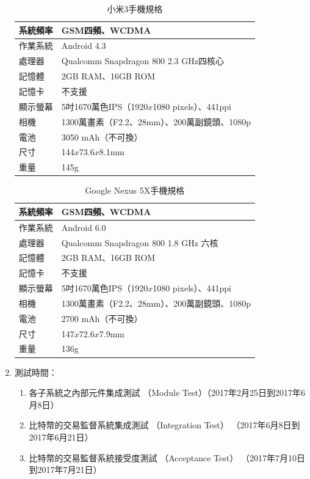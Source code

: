 \begin{enumerate}
	 				\begin{table}[!htbp]
					\centering
					\caption{小米3手機規格}
					\label{mi}
					\begin{tabular}{|l|l|}
					\hline
					系統頻率 & GSM四頻、WCDMA \\ \hline
					作業系統 & Android 4.3 \\ \hline
					處理器 & Qualcomm Snapdragon 800 2.3 GHz四核心 \\ \hline
					記憶體 & 2GB RAM、16GB ROM \\ \hline
					記憶卡 & 不支援 \\ \hline
					顯示螢幕 & 5吋1670萬色IPS（1920$x$1080 pixels）、441ppi \\ \hline
					相機 & 1300萬畫素（F2.2、28mm）、200萬副鏡頭、1080p \\ \hline
					電池 & 3050 mAh（不可換） \\ \hline
					尺寸 & 144$x$73.6$x$8.1mm \\ \hline
					重量 & 145g \\ \hline
					\end{tabular}
					\end{table}

					\begin{table}[!htbp]
					\centering
					\caption{Google Nexus 5X手機規格}
					\label{5x}
					\begin{tabular}{|l|l|}
					\hline
					系統頻率 & GSM四頻、WCDMA \\ \hline
					作業系統 & Android 6.0 \\ \hline
					處理器 & Qualcomm Snapdragon 800 1.8 GHz 六核 \\ \hline
					記憶體 & 2GB RAM、16GB ROM \\ \hline
					記憶卡 & 不支援 \\ \hline
					顯示螢幕 & 5吋1670萬色IPS（1920$x$1080 pixels）、441ppi \\ \hline
					相機 & 1300萬畫素（F2.2、28mm）、200萬副鏡頭、1080p \\ \hline
					電池 & 2700 mAh（不可換） \\ \hline
					尺寸 & 147$x$72.6$x$7.9mm \\ \hline
					重量 & 136g \\ \hline
					\end{tabular}
					\end{table}

	 		\item 測試時間：

	 			\begin{enumerate}
	 				\item 各子系統之內部元件集成測試 （Module Test）（2017年2月25日到2017年6月8日）
	 				\item 比特幣的交易監督系統集成測試 （Integration Test） （2017年6月8日到2017年6月21日）
	 				\item 比特幣的交易監督系統接受度測試 （Acceptance Test） （2017年7月10日到2017年7月21日）
				\end{enumerate}


\end{enumerate}
